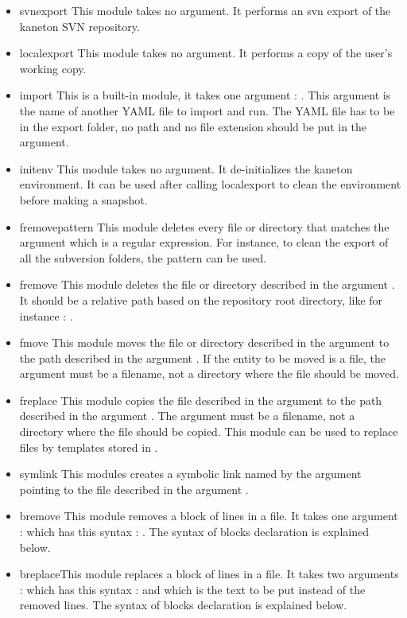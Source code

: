 \begin{itemize}
\item{svnexport} This module takes no argument. It performs an svn export of the kaneton SVN repository.
\item{localexport} This module takes no argument. It performs a copy of the user's working copy.
\item{import} This is a built-in module, it takes one argument : . This argument is the name of another YAML file to import and run. The YAML file has to be in the export folder, no path and no file extension should be put in the argument.
\item{initenv} This module takes no argument. It de-initializes the kaneton environment. It can be used after calling localexport to clean the environment before making a snapshot.
\item{fremovepattern} This module deletes every file or directory that matches the  argument which is a regular expression. For instance, to clean the export of all the subversion folders, the pattern  can be used.
\item{fremove} This module deletes the file or directory described in the argument . It should be a relative path based on the repository root directory, like for instance : .
\item{fmove} This module moves the file or directory described in the argument  to the path described in the argument . If the entity to be moved is a file, the  argument must be a filename, not a directory where the file should be moved.
\item{freplace} This module copies the file described in the argument  to the path described in the argument . The  argument must be a filename, not a directory where the file should be copied. This module can be used to replace files by templates stored in .
\item{symlink} This modules creates a symbolic link named by the argument  pointing to the file described in the argument .
\item{bremove} This module removes a block of lines in a file. It takes one argument :  which has this syntax : . The syntax of blocks declaration is explained below.
\item{breplace}This module replaces a block of lines in a file. It takes two arguments :  which has this syntax :  and  which is the text to be put instead of the removed lines. The syntax of blocks declaration is explained below.
\end{itemize}

